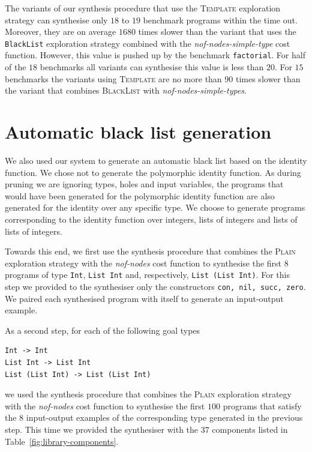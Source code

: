 The variants of our synthesis procedure that use the \textsc{Template} exploration strategy can synthesise only $18$ to $19$ benchmark programs within the time out. Moreover, they are on average $1680$ times slower than the variant that uses the \lstinline?BlackList? exploration strategy combined with the \textit{nof-nodes-simple-type} cost function. However, this value is pushed up by the benchmark \lstinline?factorial?. For half of the $18$ benchmarks all variants can synthesise this value is less than $20$. For $15$ benchmarks the variants using \textsc{Template} are no more than $90$ times slower than the variant that combines \textsc{BlackList} with \textit{nof-nodes-simple-types}.


\section{Automatic black list generation}\label{Black list generation}
We also used our system to generate an automatic black list based on the identity function. We chose not to generate the polymorphic identity function. As during pruning we are ignoring types, holes and input variables, the programs that would have been generated for the polymorphic identity function are also generated for the identity over any specific type. We choose to generate programs corresponding to the identity function over integers, lists of integers and lists of lists of integers.

Towards this end, we first use the synthesis procedure that combines the \textsc{Plain} exploration strategy with the \textit{nof-nodes} cost function to synthesise the first $8$ programs of type \lstinline?Int?, \lstinline?List Int? and, respectively, \lstinline?List (List Int)?. For this step we provided to the synthesiser only the constructors \lstinline?con, nil, succ, zero?. We paired each synthesised program with itself to generate an input-output example.

As a second step, for each of the following goal types
\begin{lstlisting}[style=plain]
Int -> Int
List Int -> List Int
List (List Int) -> List (List Int)
\end{lstlisting}
we used the synthesis procedure that combines the \textsc{Plain} exploration strategy with the \textit{nof-nodes} cost function to synthesise the first $100$ programs that satisfy the $8$ input-output examples of the corresponding type generated in the previous step. This time we provided the synthesiser with the $37$ components listed in Table~\ref{fig:library-components}.

